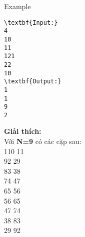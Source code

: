 Example
\begin{verbatim}
\textbf{Input:}
4
10
11
121
22
10
\textbf{Output:}
1
1
9
2\end{verbatim}

\textbf{Giải thích:}
\\Với\textbf{ N=9} có các cặp sau:
\\110 11
\\92 29
\\83 38
\\74 47
\\65 56
\\56 65
\\47 74
\\38 83
\\29 92

 
